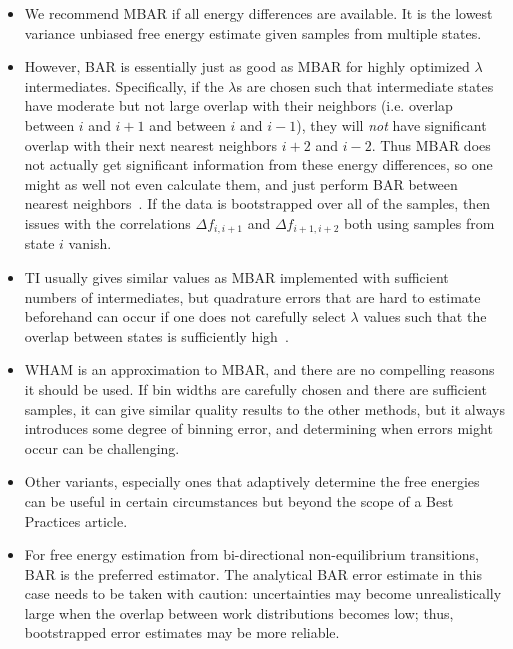 \begin{itemize}
\item We recommend MBAR if all energy differences are available. It is the lowest variance unbiased free energy estimate given samples from multiple states.
\item However, BAR is essentially just as good as MBAR for highly optimized $\lambda$ intermediates. Specifically, if the $\lambda$s are chosen such that intermediate states have moderate but not large overlap with their neighbors (i.e. overlap between $i$ and $i+1$ and between $i$ and $i-1$), they will \textit{not} have significant overlap with their next nearest neighbors $i+2$ and $i-2$. Thus MBAR does not actually get significant information from these energy differences, so one might as well not even calculate them, and just perform BAR between nearest neighbors~\cite{paliwal2011benchmark}.  If the data is bootstrapped over all of the samples, then issues with the correlations $\Delta f_{i,i+1}$ and $\Delta f_{i+1,i+2}$ both using samples from state $i$ vanish.
\item TI usually gives similar values as MBAR implemented with sufficient numbers of intermediates, but quadrature errors that are hard to estimate beforehand  can occur if one does not carefully select $\lambda$ values such that the overlap between states is sufficiently high~\cite{paliwal2011benchmark}.
\item WHAM is an approximation to MBAR, and there are no compelling reasons it should be used. If bin widths are carefully chosen and there are sufficient samples, it can give similar quality results to the other methods, but it always introduces some degree of binning error, and determining when errors might occur can be challenging. 
\item Other variants, especially ones that adaptively determine the free energies can be useful in certain circumstances but beyond the scope of a Best Practices article.
\item For free energy estimation from bi-directional non-equilibrium transitions, BAR is the preferred estimator. The analytical BAR error estimate in this case needs to be taken with caution: uncertainties may become unrealistically large when the overlap between work distributions becomes low; thus, bootstrapped error estimates may be more reliable. 
\end{itemize}


